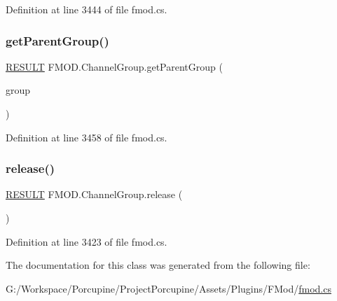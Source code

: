 Definition at line 3444 of file fmod.\+cs.

\mbox{\label{class_f_m_o_d_1_1_channel_group_a7440720697ce62ba2d9bfc9eca55ab8a}} 
\subsubsection{\texorpdfstring{get\+Parent\+Group()}{getParentGroup()}}
{\footnotesize\ttfamily \hyperlink{namespace_f_m_o_d_a305d1176ef3f8c8815861a60407ac33d}{R\+E\+S\+U\+LT} F\+M\+O\+D.\+Channel\+Group.\+get\+Parent\+Group (\begin{DoxyParamCaption}\item[{out \hyperlink{class_f_m_o_d_1_1_channel_group}{Channel\+Group}}]{group }\end{DoxyParamCaption})}



Definition at line 3458 of file fmod.\+cs.

\mbox{\label{class_f_m_o_d_1_1_channel_group_af3e707a8f005ad3a94779027bd20bc1a}} 
\subsubsection{\texorpdfstring{release()}{release()}}
{\footnotesize\ttfamily \hyperlink{namespace_f_m_o_d_a305d1176ef3f8c8815861a60407ac33d}{R\+E\+S\+U\+LT} F\+M\+O\+D.\+Channel\+Group.\+release (\begin{DoxyParamCaption}{ }\end{DoxyParamCaption})}



Definition at line 3423 of file fmod.\+cs.



The documentation for this class was generated from the following file\+:\begin{DoxyCompactItemize}
\item 
G\+:/\+Workspace/\+Porcupine/\+Project\+Porcupine/\+Assets/\+Plugins/\+F\+Mod/\hyperlink{fmod_8cs}{fmod.\+cs}\end{DoxyCompactItemize}

